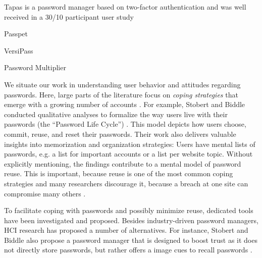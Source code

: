 	Tapas is a password manager based on two-factor authentication and was well received in a 30/10 participant user study \cite{McCarney2012Tapas, McCarney2013PWMThesis}
	
	Passpet \cite{Yee2006Passpet}
	
	VersiPass \cite{Stobert2014PWMThatDoesntRemember}
	
	Password Multiplier \cite{Halderman2005ConvenientPWM}
	
	We situate our work in understanding user behavior and attitudes regarding passwords. Here, large parts of the literature focus on \textit{coping strategies} that emerge with a growing number of accounts \cite{Florencio2007LargeScaleStudyPasswordHabits, Florencio2014PasswordPortfoliosFiniteUser}. For example, Stobert and Biddle conducted qualitative analyses to formalize the way users live with their passwords (the ``Password Life Cycle'') \cite{Stobert2014PasswordLifeCycle}. This model depicts how users choose, commit, reuse, and reset their passwords. Their work also delivers valuable insights into memorization and organization strategies: Users have mental lists of passwords, e.g. a list for important accounts or a list per website topic. Without explicitly mentioning, the findings contribute to a mental model of password reuse. This is important, because reuse is one of the most common coping strategies \cite{Das2014TangledWeb, Gaw2006PasswordManagement, Hayashi2011DiaryStudyPWs} and many researchers discourage it, because a breach at one site can compromise many others \cite{Bonneau2012ScienceOfGuessing, Komanduri2011OfPasswordsAndPeople}. 
	
	To facilitate coping with passwords and possibly minimize reuse, dedicated tools have been investigated and proposed. Besides industry-driven password managers, HCI research has proposed a number of alternatives. For instance, Stobert and Biddle also propose a password manager that is designed to boost trust as it does not directly store passwords, but rather offers a image cues to recall passwords \cite{Stobert2014PWMThatDoesntRemember}. 
	
	
	\cite{Bojinov2010KamouflagePWM}
	
	\cite{Fagan2017UsersConsiderationsPWMs}